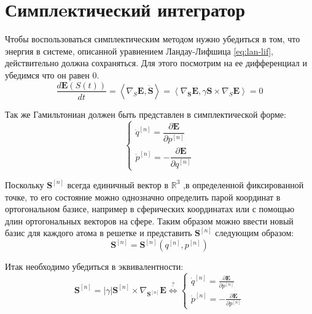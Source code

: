 \section{Симплeктический интегратор}\label{sec:symplectic-integrator}
Чтобы воспользоваться симплектическим методом нужно убедиться в том,
что энергия в системе, описанной уравнением Ландау-Лифшица \ref{eq:lan-lif},
действительно должна сохраняться. Для этого посмотрим на ее дифференциал и
убедимся что он равен $0$.
\begin{equation}
    \frac{d\mathbf E(S(t))}{dt} =
    \left<\nabla_S \mathbf E, \dot{\mathbf S} \right> =
    \left< \nabla_\mathbf S \mathbf E, \gamma \mathbf S \times \nabla_S \mathbf E
    \right> = 0
\end{equation}

Так же Гамильтониан должен быть представлен в симплектической форме:
\begin{equation}\label{eq:ham_sym_form}
    \begin{cases}
        \dot q^{[n]} = \dfrac{\partial \mathbf E}{\partial p^{[n]}}
        \\
        \dot p^{[n]} = - \dfrac{\partial \mathbf E}{\partial q^{[n]}}
    \end{cases}
\end{equation}

Поскольку $\mathbf S^{[n]}$ всегда единичный вектор в $\mathds R^3$
,в определенной фиксированной точке, то его состояние можно однозначно
определить парой координат в ортогональном базисе, например в сферических
координатах или с помощью длин ортогональных векторов на сфере.
Таким образом можно ввести новый базис для
каждого атома в решетке и представить $\mathbf S^{[n]}$
следующим образом:
\begin{equation}
    \mathbf S^{[n]} = \mathbf S^{[n]}(q^{[n]}, p^{[n]})
\end{equation}

Итак необходимо убедиться в эквивалентности:
\begin{equation}\label{eq:is_ham_split_eq}
    \mathbf S^{[n]} = |\gamma| \mathbf S^{[n]}\times \nabla_{\mathbf S^{[n]}}
    \mathbf E
    \overset{?}{\Leftrightarrow}
    \begin{cases}
        \dot q^{[n]} = \frac{\partial \mathbf E}{\partial p^{[n]}}
        \\
        \dot p^{[n]} = -\frac{\partial \mathbf E}{\partial p^{[n]}}
    \end{cases}
\end{equation}

